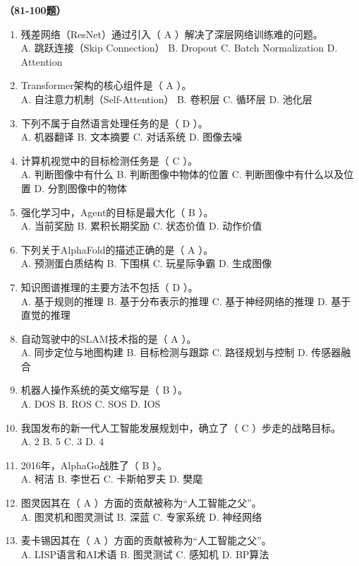 \vspace{1em}
\textbf{（81-100题）}
\begin{enumerate}[resume,leftmargin=2em,itemsep=1pt]
\item 残差网络（ResNet）通过引入（ A ）解决了深层网络训练难的问题。
\\ A. 跳跃连接（Skip Connection） B. Dropout C. Batch Normalization D. Attention
\item Transformer架构的核心组件是（ A ）。
\\ A. 自注意力机制（Self-Attention） B. 卷积层 C. 循环层 D. 池化层
\item 下列不属于自然语言处理任务的是（ D ）。
\\ A. 机器翻译 B. 文本摘要 C. 对话系统 D. 图像去噪
\item 计算机视觉中的目标检测任务是（ C ）。
\\ A. 判断图像中有什么 B. 判断图像中物体的位置 C. 判断图像中有什么以及位置 D. 分割图像中的物体
\item 强化学习中，Agent的目标是最大化（ B ）。
\\ A. 当前奖励 B. 累积长期奖励 C. 状态价值 D. 动作价值
\item 下列关于AlphaFold的描述正确的是（ A ）。
\\ A. 预测蛋白质结构 B. 下围棋 C. 玩星际争霸 D. 生成图像
\item 知识图谱推理的主要方法不包括（ D ）。
\\ A. 基于规则的推理 B. 基于分布表示的推理 C. 基于神经网络的推理 D. 基于直觉的推理
\item 自动驾驶中的SLAM技术指的是（ A ）。
\\ A. 同步定位与地图构建 B. 目标检测与跟踪 C. 路径规划与控制 D. 传感器融合
\item 机器人操作系统的英文缩写是（ B ）。
\\ A. DOS B. ROS C. SOS D. IOS
\item 我国发布的新一代人工智能发展规划中，确立了（ C ）步走的战略目标。
\\ A. 2 B. 5 C. 3 D. 4
\item 2016年，AlphaGo战胜了（ B ）。
\\ A. 柯洁 B. 李世石 C. 卡斯帕罗夫 D. 樊麾
\item 图灵因其在（ A ）方面的贡献被称为“人工智能之父”。
\\ A. 图灵机和图灵测试 B. 深蓝 C. 专家系统 D. 神经网络
\item 麦卡锡因其在（ A ）方面的贡献被称为“人工智能之父”。
\\ A. LISP语言和AI术语 B. 图灵测试 C. 感知机 D. BP算法

\end{enumerate}
